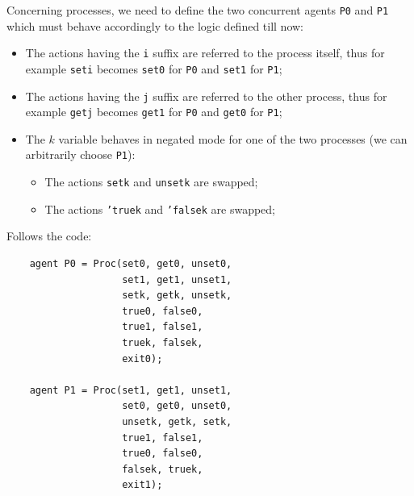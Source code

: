 \documentclass[10pt,a4paper]{article}
\newcommand{\CCSCode}[1]{{\tt #1}}
\newcommand{\Agent}[1]{{\tt {#1}}}
\begin{document}
            Concerning processes, we need to define the two concurrent
            agents \Agent{P0} and \Agent{P1} which must behave accordingly
            to the logic defined till now:
            \begin{itemize}

            \item   The actions having the \CCSCode{i} suffix are referred
                    to the process itself, thus for example \CCSCode{seti}
                    becomes \CCSCode{set0} for \Agent{P0} and
                    \CCSCode{set1} for \Agent{P1};

            \item   The actions having the \CCSCode{j} suffix are referred
                    to the other process, thus for example \CCSCode{getj}
                    becomes \CCSCode{get1} for \Agent{P0} and
                    \CCSCode{get0} for \Agent{P1};

            \item   The $k$ variable behaves in negated mode for one of
                    the two processes (we can arbitrarily choose
                    \Agent{P1}):

                \begin{itemize}

                \item   The actions \CCSCode{setk} and \CCSCode{unsetk}
                        are swapped;
                \item   The actions \CCSCode{'truek} and \CCSCode{'falsek}
                        are swapped;

                \end{itemize}

            \end{itemize}

            Follows the code:
            \begin{verbatim}
    agent P0 = Proc(set0, get0, unset0,
                    set1, get1, unset1,
                    setk, getk, unsetk,
                    true0, false0,
                    true1, false1,
                    truek, falsek,
                    exit0);

    agent P1 = Proc(set1, get1, unset1,
                    set0, get0, unset0,
                    unsetk, getk, setk,
                    true1, false1,
                    true0, false0,
                    falsek, truek,
                    exit1);
        \end{verbatim}
\end{document}
